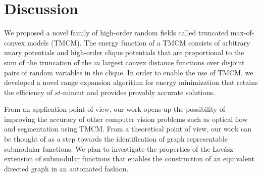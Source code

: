 \documentclass[runningheads]{llncs}
\newcommand{\mysection}[1]{\vspace{-2mm}\section{#1}\vspace{-2mm}}
\begin{document}
\mysection{Discussion}
We proposed a novel family of high-order random fields called truncated max-of-convex models (TMCM). The energy function of
a TMCM consists of arbitrary unary potentials and high-order clique potentials that are proportional to the sum of the truncation
of the $m$ largest convex distance functions over disjoint pairs of random variables in the clique. In order to enable the use
of TMCM, we developed a novel range expansion algorithm for energy minimization that retains
the efficiency of $st$-{\sc mincut} and provides provably accurate solutions.

From an application point of view, our work opens up the possibility of improving the accuracy of other
computer vision problems such as optical flow and segmentation using TMCM. From a theoretical point of view, our work can be
thought of as a step towards the identification of graph representable submodular functions. We plan to investigate the
properties of the Lov\'{a}sz extension of submodular functions that enables the construction of an equivalent directed graph in
an automated fashion.

\clearpage
{\small


}
\end{document}
